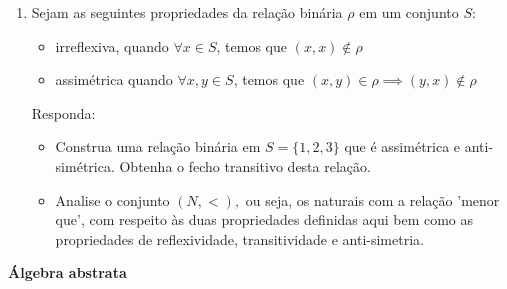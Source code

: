 \documentclass[]{book}
\theoremstyle{definition}
\begin{document}
\begin{enumerate}
\item \label{caushw}  Sejam as seguintes propriedades da relação binária $\rho$ em um conjunto $S$:

\begin{itemize}
\item	 irreflexiva, quando $\forall x \in S$, temos que $(x,x) \notin \rho$
\item assimétrica quando $\forall x,y \in S$, temos que $(x,y) \in \rho \implies (y,x) \notin \rho$
\end{itemize}

Responda:
\begin{itemize}
\item Construa uma relação binária em $S = \{1,2,3\}$ que é assimétrica e anti-simétrica. Obtenha o fecho transitivo desta relação.
\item	Analise o conjunto $(N, <),$ ou seja, os naturais com a relação 'menor que', com respeito às duas propriedades definidas aqui bem como as propriedades de reflexividade, transitividade e anti-simetria.
\end{itemize}



\end{enumerate}
\textbf{Álgebra abstrata}
\end{document}
